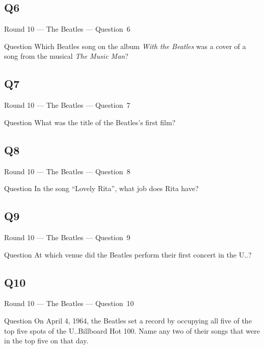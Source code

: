 \documentclass[11pt]{beamer}
\begin{document}
\subsection*{Q6}
\begin{frame}[t]{Round 10 --- The Beatles --- \mbox{Question 6}}
\vspace{-0.5em}
\begin{block}{Question}
Which Beatles song on the album \emph{With the Beatles} was a cover of a song from the musical \emph{The Music Man}?
\end{block}
\end{frame}
\subsection*{Q7}
\begin{frame}[t]{Round 10 --- The Beatles --- \mbox{Question 7}}
\vspace{-0.5em}
\begin{block}{Question}
What was the title of the Beatles's first film?
\end{block}
\end{frame}
\subsection*{Q8}
\begin{frame}[t]{Round 10 --- The Beatles --- \mbox{Question 8}}
\vspace{-0.5em}
\begin{block}{Question}
In the song ``Lovely Rita'', what job does Rita have?
\end{block}
\end{frame}
\subsection*{Q9}
\begin{frame}[t]{Round 10 --- The Beatles --- \mbox{Question 9}}
\vspace{-0.5em}
\begin{block}{Question}
At which venue did the Beatles perform their first concert in the U.\@S.\@?
\end{block}
\end{frame}
\subsection*{Q10}
\begin{frame}[t]{Round 10 --- The Beatles --- \mbox{Question 10}}
\vspace{-0.5em}
\begin{block}{Question}
On April 4, 1964, the Beatles set a record by occupying all five of the top five spots of the U.\@S.\@ Billboard Hot 100. Name any two of their songs that were in the top five on that day.
\end{block}
\end{frame}
\end{document}
